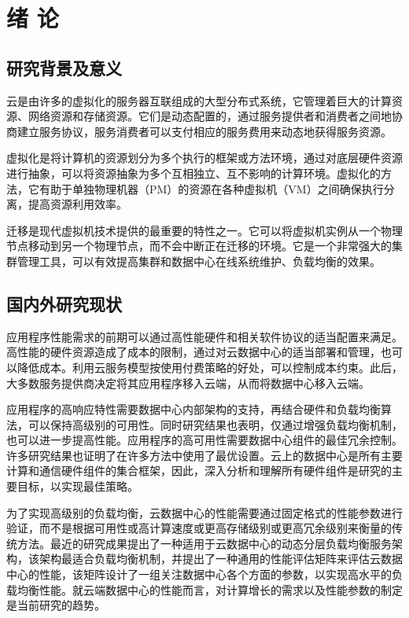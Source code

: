 \chapter{绪 论}

\section{研究背景及意义}
云是由许多的虚拟化的服务器互联组成的大型分布式系统，它管理着巨大的计算资源、网络资源和存储资源。它们是动态配置的，通过服务提供者和消费者之间地协商建立服务协议，服务消费者可以支付相应的服务费用来动态地获得服务资源\cite{Net,Net1}。

虚拟化是将计算机的资源划分为多个执行的框架或方法环境，通过对底层硬件资源进行抽象，可以将资源抽象为多个互相独立、互不影响的计算环境。虚拟化的方法，它有助于单独物理机器（PM）的资源在各种虚拟机（VM）之间确保执行分离，提高资源利用效率。

迁移是现代虚拟机技术提供的最重要的特性之一。它可以将虚拟机实例从一个物理节点移动到另一个物理节点，而不会中断正在迁移的环境。它是一个非常强大的集群管理工具，可以有效提高集群和数据中心在线系统维护、负载均衡的效果。

\section{国内外研究现状}
应用程序性能需求的前期可以通过高性能硬件和相关软件协议的适当配置来满足。高性能的硬件资源造成了成本的限制，通过对云数据中心的适当部署和管理，也可以降低成本。利用云服务模型按使用付费策略的好处，可以控制成本约束。此后，大多数服务提供商决定将其应用程序移入云端，从而将数据中心移入云端。

应用程序的高响应特性需要数据中心内部架构的支持，再结合硬件和负载均衡算法，可以保持高级别的可用性。同时研究结果也表明，仅通过增强负载均衡机制，也可以进一步提高性能\cite{Xiang,Yan}。应用程序的高可用性需要数据中心组件的最佳冗余控制。许多研究结果也证明了在许多方法中使用了最优设置\cite{Gang,Beloglazov}。云上的数据中心是所有主要计算和通信硬件组件的集合框架，因此，深入分析和理解所有硬件组件是研究的主要目标，以实现最佳策略。

为了实现高级别的负载均衡，云数据中心的性能需要通过固定格式的性能参数进行验证，而不是根据可用性或高计算速度或更高存储级别或更高冗余级别来衡量的传统方法。最近的研究成果提出了一种适用于云数据中心的动态分层负载均衡服务架构，该架构最适合负载均衡机制，并提出了一种通用的性能评估矩阵来评估云数据中心的性能，该矩阵设计了一组关注数据中心各个方面的参数，以实现高水平的负载均衡性能\cite{Kothapuli}。就云端数据中心的性能而言，对计算增长的需求以及性能参数的制定是当前研究的趋势。

